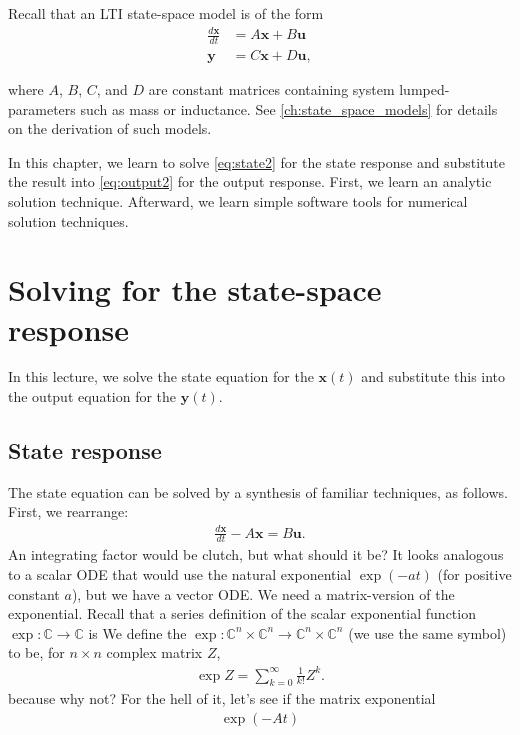 \documentclass[dynamic_systems.tex]{subfiles}
\begin{document}
Recall that an LTI state-space model is of the form
\begin{subequations}
\begin{align}
	\frac{d\bm{x}}{d t} &= A \bm{x} + B \bm{u} \label{eq:state2} \\
	\bm{y} &= C \bm{x} + D \bm{u},\label{eq:output2}
\end{align}
\end{subequations}

where $A$, $B$, $C$, and $D$ are constant matrices containing system lumped-parameters such as mass or inductance.
See \cref{ch:state_space_models} for details on the derivation of such models.

In this chapter, we learn to solve \autoref{eq:state2} for the state response and substitute the result into \autoref{eq:output2} for the output response.
First, we learn an analytic solution technique.
Afterward, we learn simple software tools for numerical solution techniques.
\tags{}

\section{Solving for the state-space response}
\tags{}

In this lecture, we solve the state equation for the  $\bm{x}(t)$ and substitute this into the output equation for the  $\bm{y}(t)$.
\tags{}

\subsection{State response}
\tags{}

The state equation can be solved by a synthesis of familiar techniques, as follows.
First, we rearrange:
\begin{align} \label{eq:state-ready-for-integrating-factor}
	\frac{d\bm{x}}{d t} - A \bm{x} = B \bm{u}.
\end{align}
An integrating factor would be clutch, but what should it be?
It looks analogous to a scalar ODE that would use the natural exponential $\exp(-a t)$ (for positive constant $a$), but we have a vector ODE.
We need a matrix-version of the exponential.
Recall that a series definition of the scalar exponential function $\exp:\mathbb{C}\rightarrow\mathbb{C}$ is
\tags{}
We define the  $\exp:\mathbb{C}^n\times\mathbb{C}^n \rightarrow \mathbb{C}^n \times \mathbb{C}^n$ (we use the same symbol) to be, for $n\times n$ complex matrix $Z$,
\begin{align}\label{eq:matrix_exponential_def}
	\exp Z = \sum_{k=0}^\infty \frac{1}{k!} Z^k.
\end{align}
because why not?
For the hell of it, let's see if the matrix exponential
\begin{align}
	\exp(-A t)
\end{align}
\end{document}
